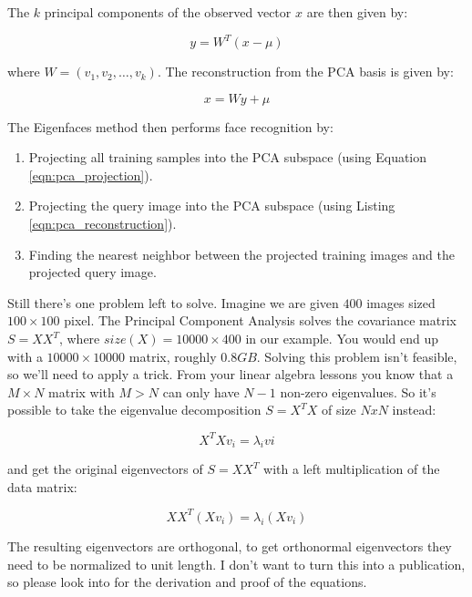 The $k$ principal components of the observed vector $x$ are then given by:

\begin{equation} \label{eqn:pca_projection}
	y = W^{T} (x - \mu)
\end{equation}

where $W = (v_{1}, v_{2}, \ldots, v_{k})$. The reconstruction from the PCA basis is given by:

\begin{equation} \label{eqn:pca_reconstruction}
	x = W y + \mu
\end{equation}

The Eigenfaces method then performs face recognition by:

\begin{enumerate}
	\item Projecting all training samples into the PCA subspace (using Equation \ref{eqn:pca_projection}).
	\item Projecting the query image into the PCA subspace (using Listing \ref{eqn:pca_reconstruction}).
	\item Finding the nearest neighbor between the projected training images and the projected query image.
\end{enumerate}

Still there's one problem left to solve. Imagine we are given $400$ images sized $100 \times 100$ pixel. The Principal Component Analysis solves the covariance matrix $S = X X^{T}$, where ${size}(X) = 10000 \times 400$ in our example. You would end up with a $10000 \times 10000$ matrix, roughly $0.8 GB$. Solving this problem isn't feasible, so we'll need to apply a trick. From your linear algebra lessons you know that a $M \times N$ matrix with $M > N$ can only have $N - 1$ non-zero eigenvalues. So it's possible to take the eigenvalue decomposition $S = X^{T} X$ of size $N x N$ instead:

\begin{equation}
	X^{T} X v_{i} = \lambda_{i} v{i}
\end{equation}

and get the original eigenvectors of $S = X X^{T}$ with a left multiplication of the data matrix:

\begin{equation}
	X X^{T} (X v_{i}) = \lambda_{i} (X v_{i})
\end{equation}

The resulting eigenvectors are orthogonal, to get orthonormal eigenvectors they need to be normalized to unit length. I don't want to turn this into a publication, so please look into \cite{Duda2001} for the derivation and proof of the equations.

